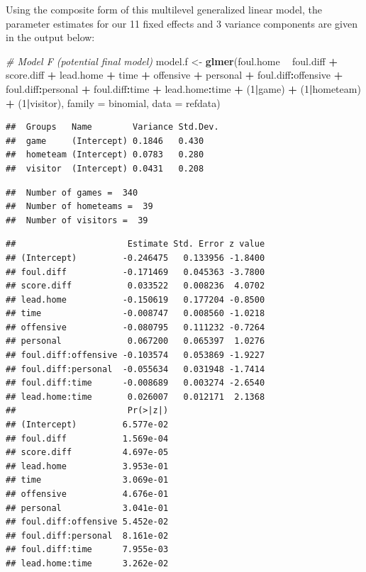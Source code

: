 \documentclass[
]{krantz}
\newenvironment{Shaded}{\begin{snugshade}}{\end{snugshade}}
\newcommand{\CommentTok}[1]{\textcolor[rgb]{0.37,0.37,0.37}{\textit{#1}}}
\newcommand{\DataTypeTok}[1]{\textcolor[rgb]{0.27,0.27,0.27}{#1}}
\newcommand{\DecValTok}[1]{\textcolor[rgb]{0.06,0.06,0.06}{#1}}
\newcommand{\KeywordTok}[1]{\textcolor[rgb]{0.27,0.27,0.27}{\textbf{#1}}}
\newcommand{\NormalTok}[1]{#1}
\newcommand{\OperatorTok}[1]{\textcolor[rgb]{0.43,0.43,0.43}{\textbf{#1}}}
\newcommand{\StringTok}[1]{\textcolor[rgb]{0.5,0.5,0.5}{#1}}
\begin{document}
Using the composite form of this multilevel generalized linear model, the parameter estimates for our 11 fixed effects and 3 variance components are given in the output below:

\begin{Shaded}
\begin{Highlighting}[]
\CommentTok{# Model F (potential final model)}
\NormalTok{model.f <-}\StringTok{ }\KeywordTok{glmer}\NormalTok{(foul.home }\OperatorTok{~}\StringTok{ }\NormalTok{foul.diff }\OperatorTok{+}\StringTok{ }\NormalTok{score.diff }\OperatorTok{+}\StringTok{ }
\StringTok{  }\NormalTok{lead.home }\OperatorTok{+}\StringTok{ }\NormalTok{time }\OperatorTok{+}\StringTok{ }\NormalTok{offensive }\OperatorTok{+}\StringTok{ }\NormalTok{personal }\OperatorTok{+}\StringTok{ }
\StringTok{  }\NormalTok{foul.diff}\OperatorTok{:}\NormalTok{offensive }\OperatorTok{+}\StringTok{ }\NormalTok{foul.diff}\OperatorTok{:}\NormalTok{personal }\OperatorTok{+}\StringTok{ }
\StringTok{  }\NormalTok{foul.diff}\OperatorTok{:}\NormalTok{time }\OperatorTok{+}\StringTok{ }\NormalTok{lead.home}\OperatorTok{:}\NormalTok{time }\OperatorTok{+}\StringTok{ }\NormalTok{(}\DecValTok{1}\OperatorTok{|}\NormalTok{game) }\OperatorTok{+}\StringTok{ }
\StringTok{  }\NormalTok{(}\DecValTok{1}\OperatorTok{|}\NormalTok{hometeam) }\OperatorTok{+}\StringTok{ }\NormalTok{(}\DecValTok{1}\OperatorTok{|}\NormalTok{visitor),}
  \DataTypeTok{family =}\NormalTok{ binomial, }\DataTypeTok{data =}\NormalTok{ refdata)}
\end{Highlighting}
\end{Shaded}

\begin{verbatim}
##  Groups   Name        Variance Std.Dev.
##  game     (Intercept) 0.1846   0.430   
##  hometeam (Intercept) 0.0783   0.280   
##  visitor  (Intercept) 0.0431   0.208
\end{verbatim}

\begin{verbatim}
##  Number of games =  340 
##  Number of hometeams =  39 
##  Number of visitors =  39
\end{verbatim}

\begin{verbatim}
##                      Estimate Std. Error z value
## (Intercept)         -0.246475   0.133956 -1.8400
## foul.diff           -0.171469   0.045363 -3.7800
## score.diff           0.033522   0.008236  4.0702
## lead.home           -0.150619   0.177204 -0.8500
## time                -0.008747   0.008560 -1.0218
## offensive           -0.080795   0.111232 -0.7264
## personal             0.067200   0.065397  1.0276
## foul.diff:offensive -0.103574   0.053869 -1.9227
## foul.diff:personal  -0.055634   0.031948 -1.7414
## foul.diff:time      -0.008689   0.003274 -2.6540
## lead.home:time       0.026007   0.012171  2.1368
##                      Pr(>|z|)
## (Intercept)         6.577e-02
## foul.diff           1.569e-04
## score.diff          4.697e-05
## lead.home           3.953e-01
## time                3.069e-01
## offensive           4.676e-01
## personal            3.041e-01
## foul.diff:offensive 5.452e-02
## foul.diff:personal  8.161e-02
## foul.diff:time      7.955e-03
## lead.home:time      3.262e-02
\end{verbatim}
\end{document}
